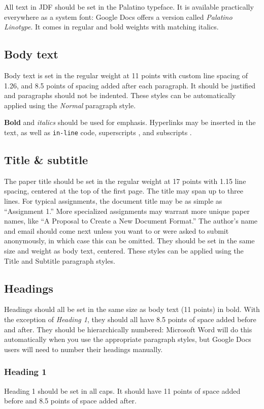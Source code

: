 {{{{All text in JDF should be set in the Palatino typeface. It is available practically everywhere as a system font: Google Docs offers a version called \emph{Palatino Linotype}. It comes in regular and bold weights with matching italics.

\subsection{Body text}
Body text is set in the regular weight at 11 points with custom line spacing of 1.26, and 8.5 points of spacing added after each paragraph. It should be justified and paragraphs should not be indented. These styles can be automatically applied using the \emph{Normal} paragraph style.

\textbf{Bold} and \emph{italics} should be used for emphasis. Hyperlinks may be inserted in the text, as well as \texttt{in-line} code, superscripts , and subscripts .

\subsection{Title \& subtitle}
The paper title should be set in the regular weight at 17 points with 1.15 line spacing, centered at the top of the first page. The title may span up to three lines. For typical assignments, the document title may be as simple as “Assignment 1.” More specialized assignments may warrant more unique paper names, like “A Proposal to Create a New Document Format.”
The author’s name and email should come next unless you want to or were asked to submit anonymously, in which case this can be omitted. They should be set in the same size and weight as body text, centered. These styles can be applied using the Title and Subtitle paragraph styles.

\subsection{Headings}
Headings should all be set in the same size as body text (11 points) in bold. With the exception of \emph{Heading 1}, they should all have 8.5 points of space added before and after. They should be hierarchically numbered: Microsoft Word will do this automatically when you use the appropriate paragraph styles, but Google Docs users will need to number their headings manually.

\subsubsection{Heading 1}
Heading 1 should be set in all caps. It should have 11 points of space added before and 8.5 points of space added after.

}}}}
